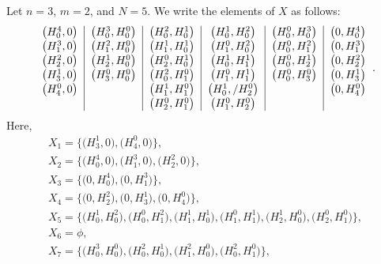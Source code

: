 \documentclass[10pt,a4paper]{amsart}
\numberwithin{equation}{section}
\begin{document}
\begin{Example}%

Let $n=3$, $m=2$, and $N=5$. We write the elements of $X$ as follows:
\[
\begin{tabular}{c|c|c|c|c|c}
$\bigl(H^{4}_{0},0\bigr)$ & $\bigl(H^{3}_{0},H^{0}_{0}\bigr)$ & $\bigl(H^{2}_{0},H^{1}_{0}\bigr)$ & $\bigl(H^{1}_{0},H^{2}_{0}\bigr)$ & $\bigl(H^{0}_{0},H^{3}_{0}\bigr)$ & $\bigl(0,H^{4}_{0}\bigr)$ \\[0.3mm]
$\bigl(H^{3}_{1},0\bigr)$ & $\bigl(H^{2}_{1},H^{0}_{0}\bigr)$ & $\bigl(H^{1}_{1},H^{1}_{0}\bigr)$ & $\bigl(H^{0}_{1},H^{2}_{0}\bigr)$ & $\bigl(H^{0}_{0},H^{2}_{1}\bigr)$ & $\bigl(0,H^{3}_{1}\bigr)$ \\[0.3mm]
$\bigl(H^{2}_{2},0\bigr)$ & $\bigl(H^{1}_{2},H^{0}_{0}\bigr)$ & $\bigl(H^{0}_{2},H^{1}_{0}\bigr)$ & $\bigl(H^{1}_{0},H^{1}_{1}\bigr)$ & $\bigl(H^{0}_{0},H^{1}_{2}\bigr)$ & $\bigl(0,H^{2}_{2}\bigr)$ \\[0.3mm]
$\bigl(H^{1}_{3},0\bigr)$ & $\bigl(H^{0}_{3},H^{0}_{0}\bigr)$ & $\bigl(H^{2}_{0},H^{0}_{1}\bigr)$ & $\bigl(H^{0}_{1},H^{1}_{1}\bigr)$ & $\bigl(H^{0}_{0},H^{0}_{3}\bigr)$ & $\bigl(0,H^{1}_{3}\bigr)$ \\[0.3mm]
$\bigl(H^{0}_{4},0\bigr)$ & & $\bigl(H^{1}_{1},H^{0}_{1}\bigr)$ & $\bigl(H^{1}_{0},/H^{0}_{2}\bigr)$ & & $\bigl(0,H^{0}_{4}\bigr)$ \\[0.3mm]
 & & $\bigl(H^{0}_{2},H^{0}_{1}\bigr)$ & $\bigl(H^{0}_{1},H^{0}_{2}\bigr)$ & &
\end{tabular}.
\]
Here,
\begin{gather*}
X_1=\bigl\{\bigl(H^{1}_{3},0\bigr), \bigl(H^{0}_{4},0\bigr)\bigr\},\\
X_2=\bigl\{\bigl(H^{4}_{0},0\bigr), \bigl(H^{3}_{1},0\bigr), \bigl(H^{2}_{2},0\bigr)\bigr\},\\
X_3=\bigl\{\bigl(0,H^{4}_{0}\bigr),\bigl(0,H^{3}_{1}\bigr)\bigr\},\\
X_4=\bigl\{\bigl(0,H^{2}_{2}\bigr),\bigl(0,H^{1}_{3}\bigr),\bigl(0,H^{0}_{4}\bigr)\bigr\},\\
X_5=\bigl\{\bigl(H^{1}_{0},H^{2}_{0}\bigr),\bigl(H^{0}_{0},H^{2}_{1}\bigr),\bigl(H^{1}_{1},H^{1}_{0}\bigr),\bigl(H^{0}_{1},H^{1}_{1}\bigr),\bigl(H^{1}_{2},H^{0}_{0}\bigr),\bigl(H^{0}_{2},H^{0}_{1}\bigr)\bigr\},\\
X_6=\phi, \\
X_7=\bigl\{\bigl(H^{3}_{0},H^{0}_{0}\bigr),\bigl(H^{2}_{0},H^{1}_{0}\bigr),\bigl(H^{2}_{1},H^{0}_{0}\bigr),\bigl(H^{2}_{0},H^{0}_{1}\bigr)\bigr\},\\

\end{gather*}
\end{Example}
\end{document}
